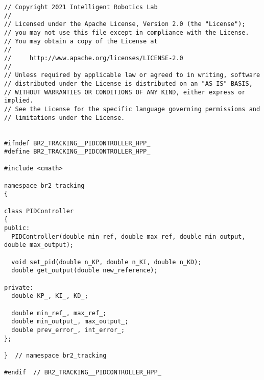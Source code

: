  \footnotesize
\begin{tcolorbox}[sharp corners, colframe=gray!80, colback=LightGray, left=0pt, top=0pt, bottom=0pt, title=\texttt{br2\_tracking/include/br2\_tracking/PIDController.hpp}]
  \begin{verbatim}
// Copyright 2021 Intelligent Robotics Lab
//
// Licensed under the Apache License, Version 2.0 (the "License");
// you may not use this file except in compliance with the License.
// You may obtain a copy of the License at
//
//     http://www.apache.org/licenses/LICENSE-2.0
//
// Unless required by applicable law or agreed to in writing, software
// distributed under the License is distributed on an "AS IS" BASIS,
// WITHOUT WARRANTIES OR CONDITIONS OF ANY KIND, either express or implied.
// See the License for the specific language governing permissions and
// limitations under the License.


#ifndef BR2_TRACKING__PIDCONTROLLER_HPP_
#define BR2_TRACKING__PIDCONTROLLER_HPP_

#include <cmath>

namespace br2_tracking
{

class PIDController
{
public:
  PIDController(double min_ref, double max_ref, double min_output, double max_output);

  void set_pid(double n_KP, double n_KI, double n_KD);
  double get_output(double new_reference);

private:
  double KP_, KI_, KD_;

  double min_ref_, max_ref_;
  double min_output_, max_output_;
  double prev_error_, int_error_;
};

}  // namespace br2_tracking

#endif  // BR2_TRACKING__PIDCONTROLLER_HPP_
    \end{verbatim}
    \end{tcolorbox}
  \normalsize

